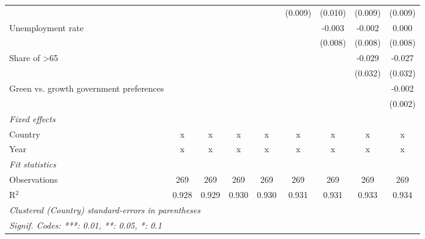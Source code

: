 \begin{table}[htbp]
\begin{tabular}{lcccccccc}
                                                               &              &              &         &         & (0.009)     & (0.010)     & (0.009)      & (0.009)\\   
      Unemployment rate                                        &              &              &         &         &             & -0.003      & -0.002       & 0.000\\   
                                                               &              &              &         &         &             & (0.008)     & (0.008)      & (0.008)\\   
      Share of >65                                             &              &              &         &         &             &             & -0.029       & -0.027\\   
                                                               &              &              &         &         &             &             & (0.032)      & (0.032)\\   
      Green vs. growth government preferences                  &              &              &         &         &             &             &              & -0.002\\   
                                                               &              &              &         &         &             &             &              & (0.002)\\   
      \emph{Fixed effects}\\
      Country                                                  & x            & x            & x       & x       & x           & x           & x            & x\\  
      Year                                                     & x            & x            & x       & x       & x           & x           & x            & x\\  
      \midrule \emph{Fit statistics}\\
      Observations                                             & 269          & 269          & 269     & 269     & 269         & 269         & 269          & 269\\  
      R$^2$                                                    & 0.928        & 0.929        & 0.930   & 0.930   & 0.931       & 0.931       & 0.933        & 0.934\\  
      \midrule
      \multicolumn{9}{l}{\emph{Clustered (Country) standard-errors in parentheses}}\\
      \multicolumn{9}{l}{\emph{Signif. Codes: ***: 0.01, **: 0.05, *: 0.1}}\\
   \end{tabular}
\end{table}



